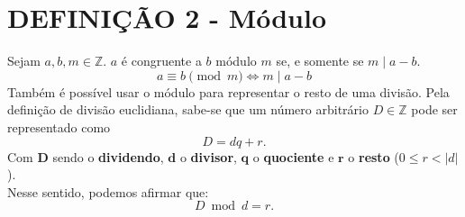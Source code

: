 \section{DEFINIÇÃO 2 - Módulo}
Sejam $a, b, m \in \mathbb{Z}$. $a$ é congruente a $b$ módulo $m$ se, e somente se $m \mid a-b$.
\[
    a \equiv b \pmod m \iff m \mid a-b
\]
Também é possível usar o módulo para representar o resto de uma divisão. Pela definição de divisão euclidiana, sabe-se que um número arbitrário $D \in \mathbb{Z}$ pode ser representado como
\[
    D = dq+r\text{.}
\]
Com $\mathbf{D}$ sendo o \textbf{dividendo}, $\mathbf{d}$ o \textbf{divisor}, $\mathbf{q}$ o \textbf{quociente} e $\mathbf{r}$ o \textbf{resto} ($0 \leq r < |d|$).\\
Nesse sentido, podemos afirmar que:
\[
    D \bmod d = r\text{.}
\]